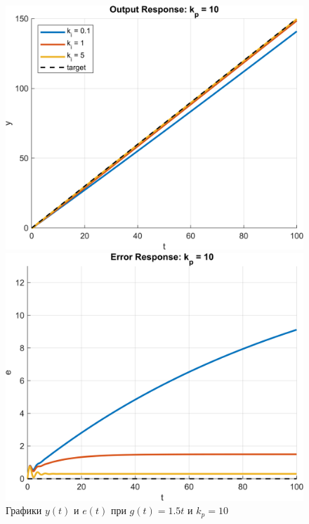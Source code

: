\begin{figure}[H]
    \centering
    \begin{minipage}{0.45\textwidth}
        \centering
        \includegraphics[width=1\textwidth, trim={1cm 0cm 1cm 0cm}]{../images/input_2_kp_10_output.png}
    \end{minipage}
    \hfill
    \begin{minipage}{0.45\textwidth}
        \centering
        \includegraphics[width=1\textwidth, trim={1cm 0cm 1cm 0cm}]{../images/input_2_kp_10_error.png}
    \end{minipage}
    \caption{Графики $y(t)$ и $e(t)$ при $g(t) = 1.5t$ и $k_p = 10$}
\end{figure}
